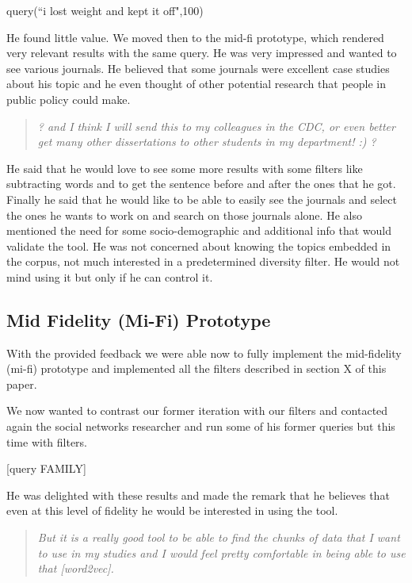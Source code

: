 \documentclass{sigchi}
\begin{document}
query(``i lost weight and kept it off",100)

He found little value. We moved then to the mid-fi prototype, which rendered very relevant results with the same query. He was very impressed and wanted to see various journals. He believed that some journals were excellent case studies about his topic and he even thought of other potential research that people in public policy could make. 

\begin{quote}
{\em
? and I think I will send this to my colleagues in the CDC, or even better get many other dissertations to other students in my department! :) ?
}\end{quote}

He said that he would love to see some more results with some filters like subtracting words and to get the sentence before and after the ones that he got. Finally he said that he would like to be able to easily see the journals and select the ones he wants to work on and search on those journals alone. He also mentioned the need for some socio-demographic and additional info that would validate the tool. He was not concerned about knowing the topics embedded in the corpus, not much interested in a predetermined diversity filter. He would not mind using it but only if he can control it.

\subsection{Mid Fidelity (Mi-Fi) Prototype}
With the provided feedback we were able now to fully implement the mid-fidelity (mi-fi) prototype and implemented all the filters described in section X of this paper.

We now wanted to contrast our former iteration with our filters and contacted again the social networks researcher and run some of his former queries but this time with filters. 

[query FAMILY]

He was delighted with these results and made the remark that he believes that even at this level of fidelity he would be interested in using the tool.
\begin{quote}
{\em
But it is a really good tool to be able to find the chunks of data that I want to use in my studies and I would feel pretty comfortable in being able to use that [word2vec].}
\end{quote}
\end{document}
